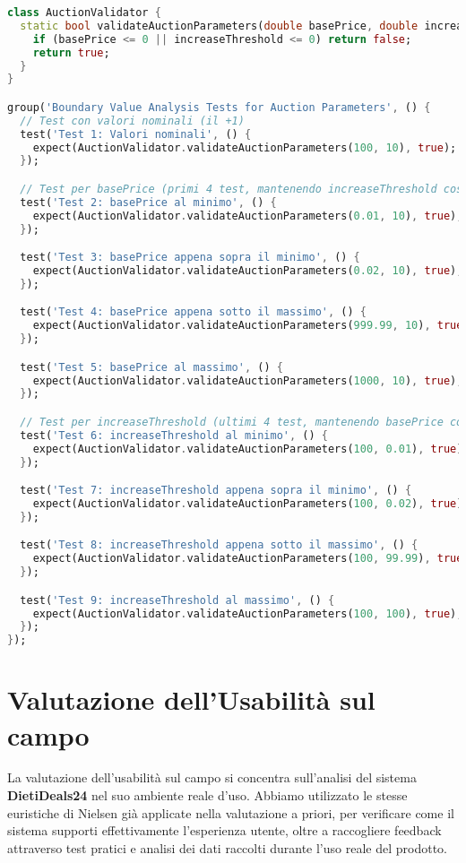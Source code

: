 \begin{lstlisting}[language=Dart]
class AuctionValidator {
  static bool validateAuctionParameters(double basePrice, double increaseThreshold) {
    if (basePrice <= 0 || increaseThreshold <= 0) return false;
    return true;
  }
}

group('Boundary Value Analysis Tests for Auction Parameters', () {
  // Test con valori nominali (il +1)
  test('Test 1: Valori nominali', () {
    expect(AuctionValidator.validateAuctionParameters(100, 10), true);
  });

  // Test per basePrice (primi 4 test, mantenendo increaseThreshold costante)
  test('Test 2: basePrice al minimo', () {
    expect(AuctionValidator.validateAuctionParameters(0.01, 10), true);
  });

  test('Test 3: basePrice appena sopra il minimo', () {
    expect(AuctionValidator.validateAuctionParameters(0.02, 10), true);
  });

  test('Test 4: basePrice appena sotto il massimo', () {
    expect(AuctionValidator.validateAuctionParameters(999.99, 10), true);
  });

  test('Test 5: basePrice al massimo', () {
    expect(AuctionValidator.validateAuctionParameters(1000, 10), true);
  });

  // Test per increaseThreshold (ultimi 4 test, mantenendo basePrice costante)
  test('Test 6: increaseThreshold al minimo', () {
    expect(AuctionValidator.validateAuctionParameters(100, 0.01), true);
  });

  test('Test 7: increaseThreshold appena sopra il minimo', () {
    expect(AuctionValidator.validateAuctionParameters(100, 0.02), true);
  });

  test('Test 8: increaseThreshold appena sotto il massimo', () {
    expect(AuctionValidator.validateAuctionParameters(100, 99.99), true);
  });

  test('Test 9: increaseThreshold al massimo', () {
    expect(AuctionValidator.validateAuctionParameters(100, 100), true);
  });
});
    \end{lstlisting}


\section{Valutazione dell'Usabilità sul campo}

La valutazione dell'usabilità sul campo si concentra sull'analisi del sistema \textbf{DietiDeals24} nel suo ambiente reale d'uso. Abbiamo utilizzato le stesse euristiche di Nielsen già applicate nella valutazione a priori, per verificare come il sistema supporti effettivamente l'esperienza utente, oltre a raccogliere feedback attraverso test pratici e analisi dei dati raccolti durante l'uso reale del prodotto.

